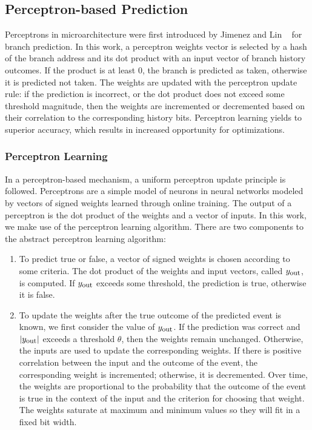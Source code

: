 \subsection{Perceptron-based Prediction}

Perceptrons in microarchitecture were first introduced by Jimenez and Lin ~\cite{Perc_Branch} for branch prediction. In this work, a perceptron weights vector is selected by a hash of the branch address and its dot product with an input vector of branch history outcomes. If the product is at least 0, the branch is predicted as taken, otherwise it is predicted not taken. The weights are updated with the perceptron update rule: if the prediction is incorrect, or the dot product does not exceed some threshold magnitude, then the weights are incremented or decremented based on their correlation to the corresponding history bits. Perceptron learning yields to superior accuracy, which results in increased opportunity for optimizations.

\subsubsection{Perceptron Learning}

In a perceptron-based mechanism, a uniform
perceptron update principle is followed.  Perceptrons are a simple model of neurons
in neural networks \cite{perceptrons1,perceptrons2} modeled by vectors of signed weights learned through online training. The output of a perceptron is the dot product of the weights and a vector of inputs. In this work, we make use of the perceptron learning algorithm. There are two components to the abstract perceptron learning algorithm:

\begin{enumerate}
\item To predict true or false, a vector of signed weights is chosen according to some criteria. The dot product of the weights and input vectors, called $y_{\mbox{\small out}}$, is computed. If $y_{\mbox{\small out}}$ exceeds some threshold, the prediction is true, otherwise it is false.

\item To update the weights after the true outcome of the predicted event is
known, we first consider the value of $y_{\mbox{\small out}}$. If the
prediction was correct and $|y_{\mbox{\small out}}|$ exceeds a threshold
$\theta$, then the weights remain unchanged. Otherwise, the inputs are used to
update the corresponding weights.  If there is positive correlation between
the input and the outcome of the event, the corresponding weight is
incremented; otherwise, it is decremented. Over time, the weights are
proportional to the probability that the outcome of the event is true in the
context of the input and the criterion for choosing that weight. The weights
saturate at maximum and minimum values so they will fit in a fixed bit width.
\end{enumerate}

